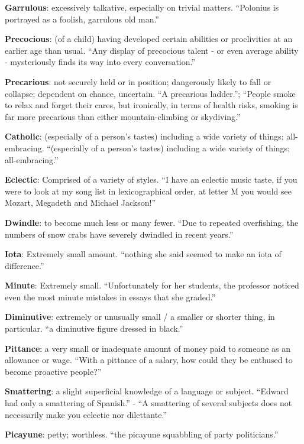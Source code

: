 \documentclass[12pt, a4paper]{ximera}
\begin{document}
\textbf{Garrulous}: excessively talkative, especially on trivial matters. ``Polonius is portrayed as a foolish, garrulous old man.''

\textbf{Precocious}: (of a child) having developed certain abilities or proclivities at an earlier age than usual. ``Any display of precocious talent - or even average ability - mysteriously finds its way into every conversation.''

\textbf{Precarious}: not securely held or in position; dangerously likely to fall or collapse; dependent on chance, uncertain. ``A precarious ladder.''; ``People smoke to relax and forget their cares, but ironically, in terms of health risks, smoking is far more precarious than either mountain-climbing or skydiving.''

\textbf{Catholic}: (especially of a person's tastes) including a wide variety of things; all-embracing. ``(especially of a person's tastes) including a wide variety of things; all-embracing.''

\textbf{Eclectic}: Comprised of a variety of styles. ``I have an eclectic music taste, if you were to look at my song list in lexicographical order, at letter M you would see Mozart, Megadeth and Michael Jackson!''

\textbf{Dwindle}: to become much less or many fewer. ``Due to repeated overfishing, the numbers of snow crabs have severely dwindled in recent years.''

\textbf{Iota}: Extremely small amount. ``nothing she said seemed to make an iota of difference.''

\textbf{Minute}: Extremely small. ``Unfortunately for her students, the professor noticed even the most minute mistakes in essays that she graded.''

\textbf{Diminutive}: extremely or unusually small / a smaller or shorter thing, in particular. ``a diminutive figure dressed in black.''

\textbf{Pittance}: a very small or inadequate amount of money paid to someone as an allowance or wage. ``With a pittance of a salary, how could they be enthused to become proactive people?''

\textbf{Smattering}: a slight superficial knowledge of a language or subject. ``Edward had only a smattering of Spanish.'' - ``A smattering of several subjects does not necessarily make you eclectic nor dilettante.''

\textbf{Picayune}: petty; worthless. ``the picayune squabbling of party politicians.''
\end{document}
